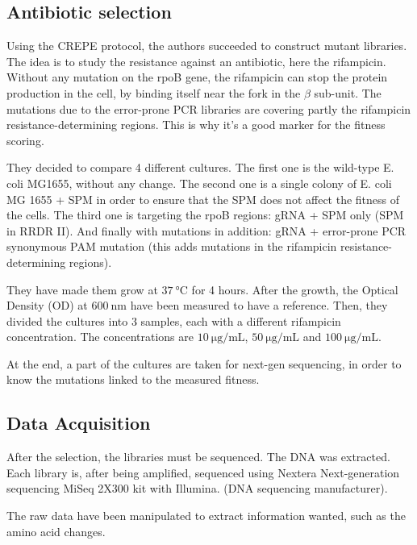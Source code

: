 \documentclass[12pt]{article}
\begin{document}
  \subsection{Antibiotic selection} 

  Using the CREPE protocol, the authors succeeded to construct mutant
  libraries. The idea is to study the resistance against an antibiotic, here
  the rifampicin. Without any mutation on the rpoB gene, the rifampicin can
  stop the protein production in the cell, by binding itself near the fork in
  the $\beta$ sub-unit. The mutations due to the error-prone PCR libraries are
  covering partly the rifampicin resistance-determining regions. This is why
  it's a good marker for the fitness scoring.

  They decided to compare 4 different cultures. The first one is the wild-type
  E. coli MG1655, without any change. The second one is a single colony of E.
  coli MG 1655 + SPM in order to ensure that the SPM does not affect the
  fitness of the cells. The third one is targeting the rpoB regions: gRNA +
  SPM only (SPM in RRDR II). And finally with mutations in addition: gRNA +
  error-prone PCR synonymous PAM mutation (this adds mutations in the
  rifampicin resistance-determining regions).

  They have made them grow at $\SI{37}{\celsius}$ for 4 hours. After the
  growth, the Optical Density (OD) at $\SI{600}{\nano\meter}$ have been
  measured to have a reference.  Then, they divided the cultures into 3
  samples, each with a different rifampicin concentration. The concentrations
  are $\SI{10}{\micro\gram\per\milli\liter}$,
  $\SI{50}{\micro\gram\per\milli\liter}$ and
  $\SI{100}{\micro\gram\per\milli\liter}$.

  At the end, a part of the cultures are taken for next-gen sequencing, in
  order to know the mutations linked to the measured fitness.

  \subsection{Data Acquisition} 

  After the selection, the libraries must be sequenced. The DNA was extracted.
  Each library is, after being amplified, sequenced using Nextera
  Next-generation sequencing MiSeq 2X300 kit with Illumina. (DNA sequencing
  manufacturer).

  The raw data have been manipulated to extract information wanted, such as the
  amino acid changes.
\end{document}

